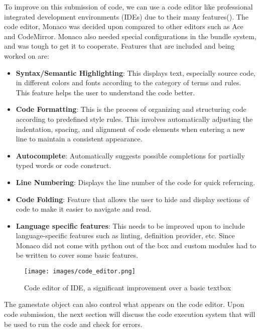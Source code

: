 To improve on this submission of code, we can use a code editor like professional integrated development environments (IDEs) due to their many features(\cite{kapoor2024analysis}). The code editor, Monaco was decided upon compared to other editors such as Ace and CodeMirror. Monaco also needed special configurations in the bundle system, and was tough to get it to cooperate. Features that are included and being worked on are:
\begin{itemize}
    \item \textbf{Syntax/Semantic Highlighting}: This displays text, especially source code, in different colors and fonts according to the category of terms and rules. This feature helps the user to understand the code better.
    \item \textbf{Code Formatting}: This is the process of organizing and structuring code according to predefined style rules. This involves automatically adjusting the indentation, spacing, and alignment of code elements when entering a new line to maintain a consistent appearance.
    \item \textbf{Autocomplete}: Automatically suggests possible completions for partially typed words or code construct.
    \item \textbf{Line Numbering}: Displays the line number of the code for quick referncing.
    \item \textbf{Code Folding}: Feature that allows the user to hide and display sections of code to make it easier to navigate and read.
    \item \textbf{Language specific features}: This needs to be improved upon to include language-specific features such as linting, definition provider, etc. Since Monaco did not come with python out of the box and custom modules had to be written to cover some basic features.
\end{itemize}
\begin{figure}[H]
    \centering
    \texttt{[image: images/code\_editor.png]}
    \caption{Code editor of IDE, a significant improvement over a basic textbox}
\end{figure}
The gamestate object can also control what appears on the code editor. Upon code submission, the next section will discuss the code execution system that will be used to run the code and check for errors.

